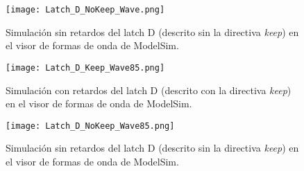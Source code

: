 \begin{figure}[ht]
	\centering
	\texttt{[image: Latch\_D\_NoKeep\_Wave.png]}
	\caption{Simulación sin retardos del latch D (descrito sin la directiva \textit{keep}) en el visor de formas de onda de ModelSim. \label{fig:Latch_D_NoKeep_Wave}}
\end{figure}

\begin{figure}[ht]
	\centering
	\texttt{[image: Latch\_D\_Keep\_Wave85.png]}
	\caption{Simulación con retardos del latch D (descrito con la directiva \textit{keep}) en el visor de formas de onda de ModelSim. \label{fig:Latch_D_Keep_Wave85}}
\end{figure}

\begin{figure}[ht]
	\centering
	\texttt{[image: Latch\_D\_NoKeep\_Wave85.png]}
	\caption{Simulación sin retardos del latch D (descrito sin la directiva \textit{keep}) en el visor de formas de onda de ModelSim. \label{fig:Latch_D_NoKeep_Wave85}}
\end{figure}